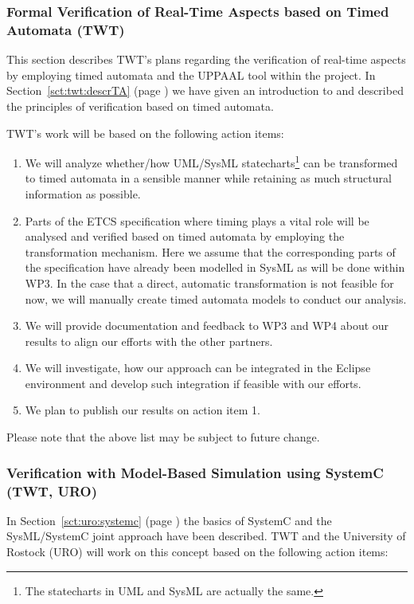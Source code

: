 \documentclass{template/openetcs_report}
\begin{document}
\subsubsection{Formal Verification of Real-Time Aspects based on Timed Automata (TWT)}
\label{sec:real-time-TA-openETCS}

This section describes TWT's plans regarding the verification of
real-time aspects by employing timed automata and the UPPAAL tool
within the project. In Section~\ref{sct:twt:descrTA} (page
\pageref{sct:twt:descrTA}) we have given an introduction to and
described the principles of verification based on timed automata.

TWT's work will be based on the following action items:
\begin{enumerate}
  \item We will analyze whether/how UML/SysML statecharts\footnote{The
statecharts in UML and SysML are actually the same.} can be
transformed to timed automata in a sensible manner while retaining as
much structural information as possible.
  \item Parts of the ETCS specification where timing plays a vital
role will be analysed and verified based on timed automata by employing
the transformation mechanism. Here we assume that the corresponding
parts of the specification have already been modelled in SysML as will
be done within WP3. In the case that a direct, automatic
transformation is not feasible for now, we will manually create timed
automata models to conduct our analysis.
  \item We will provide documentation and feedback to WP3 and WP4
about our results to align our efforts with the other partners.
  \item We will investigate, how our approach can be integrated in the
Eclipse environment and develop such integration if feasible with our
efforts.
  \item We plan to publish our results on action item 1.
\end{enumerate}

Please note that the above list may be subject to future change.

\subsubsection{Verification with Model-Based Simulation using SystemC (TWT, URO)}
\label{sec:model-based-sim-openETCS}

In Section~\ref{sct:uro:systemc} (page \pageref{sct:uro:systemc}) the
basics of SystemC and the SysML/SystemC joint approach have been
described. TWT and the University of Rostock (URO) will work on this
concept based on the following action items:
\end{document}
